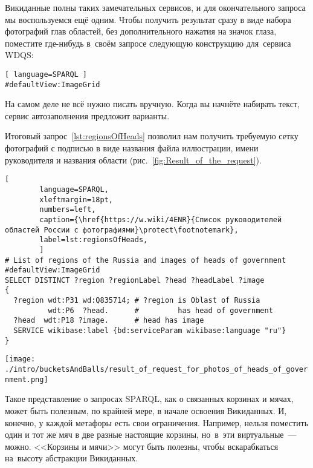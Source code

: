 Викиданные полны таких замечательных сервисов, и для окончательного запроса мы воспользуемся ещё одним. 
Чтобы получить результат сразу в виде набора фотографий глав областей, 
без дополнительного нажатия на значок глаза, 
поместите где-нибудь в~своём запросе следующую конструкцию для~сервиса WDQS:
\begin{lstlisting}[ language=SPARQL ]
#defaultView:ImageGrid
\end{lstlisting}

На самом деле не всё нужно писать вручную. Когда вы начнёте набирать текст, сервис автозаполнения предложит варианты.


\newpage
Итоговый запрос~\ref{lst:regionsOfHeads} позволил нам получить требуемую сетку фотографий 
с подписью в виде названия файла иллюстрации, имени руководителя и названия области (рис.~\ref{fig:Result_of_the_request}).

\begin{lstlisting}[ 
        language=SPARQL, 
        xleftmargin=18pt, 
        numbers=left,
        caption={\href{https://w.wiki/4ENR}{Список руководителей областей России с фотографиями}\protect\footnotemark}, 
        label=lst:regionsOfHeads, 
        ]
# List of regions of the Russia and images of heads of government
#defaultView:ImageGrid
SELECT DISTINCT ?region ?regionLabel ?head ?headLabel ?image
{
  ?region wdt:P31 wd:Q835714; # ?region is Oblast of Russia
          wdt:P6  ?head.      #         has head of government
  ?head  wdt:P18 ?image.      # head has image
  SERVICE wikibase:label {bd:serviceParam wikibase:language "ru"} 
}
\end{lstlisting}

\begin{figure*}[h!]
\texttt{[image: ./intro/bucketsAndBalls/result\_of\_request\_for\_photos\_of\_heads\_of\_government.png]}
    \caption[Сетка фотографий руководителей областей.]
    {Сетка фотографий руководителей областей 
        с~названиями файлов с~фотографиями, 
        с именами руководителей 
        и названиями областей}
    \label{fig:Result_of_the_request}
\end{figure*}

Такое представление о запросах SPARQL, как о связанных корзинах и мячах, может быть полезным, 
по крайней мере, в начале освоения Викиданных. 
И, конечно, у каждой метафоры есть свои ограничения. 
Например, нельзя поместить один и тот же мяч в две разные настоящие корзины, 
но~в~эти виртуальные~--- можно. 
<<Корзины и мячи>> могут быть полезны, чтобы вскарабкаться на~высоту абстракции Викиданных.
